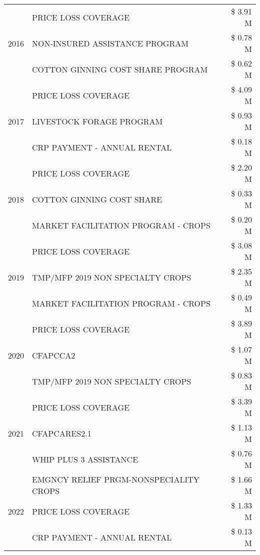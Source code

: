 \begin{tabular}{llr}
\cline{1-3}
\multirow[t]{3}{*}{2016} & PRICE LOSS COVERAGE & \$ 3.91 M \\
 & NON-INSURED ASSISTANCE PROGRAM & \$ 0.78 M \\
 & COTTON GINNING COST SHARE PROGRAM & \$ 0.62 M \\
\cline{1-3}
\multirow[t]{3}{*}{2017} & PRICE LOSS COVERAGE & \$ 4.09 M \\
 & LIVESTOCK FORAGE PROGRAM & \$ 0.93 M \\
 & CRP PAYMENT - ANNUAL RENTAL & \$ 0.18 M \\
\cline{1-3}
\multirow[t]{3}{*}{2018} & PRICE LOSS COVERAGE & \$ 2.20 M \\
 & COTTON GINNING COST SHARE & \$ 0.33 M \\
 & MARKET FACILITATION PROGRAM - CROPS & \$ 0.20 M \\
\cline{1-3}
\multirow[t]{3}{*}{2019} & PRICE LOSS COVERAGE & \$ 3.08 M \\
 & TMP/MFP 2019 NON SPECIALTY CROPS & \$ 2.35 M \\
 & MARKET FACILITATION PROGRAM - CROPS & \$ 0.49 M \\
\cline{1-3}
\multirow[t]{3}{*}{2020} & PRICE LOSS COVERAGE & \$ 3.89 M \\
 & CFAPCCA2 & \$ 1.07 M \\
 & TMP/MFP 2019 NON SPECIALTY CROPS & \$ 0.83 M \\
\cline{1-3}
\multirow[t]{3}{*}{2021} & PRICE LOSS COVERAGE & \$ 3.39 M \\
 & CFAPCARES2.1 & \$ 1.13 M \\
 & WHIP PLUS 3 ASSISTANCE & \$ 0.76 M \\
\cline{1-3}
\multirow[t]{3}{*}{2022} & EMGNCY RELIEF PRGM-NONSPECIALITY CROPS & \$ 1.66 M \\
 & PRICE LOSS COVERAGE & \$ 1.33 M \\
 & CRP PAYMENT - ANNUAL RENTAL & \$ 0.13 M \\
\cline{1-3}
\bottomrule
\end{tabular}
